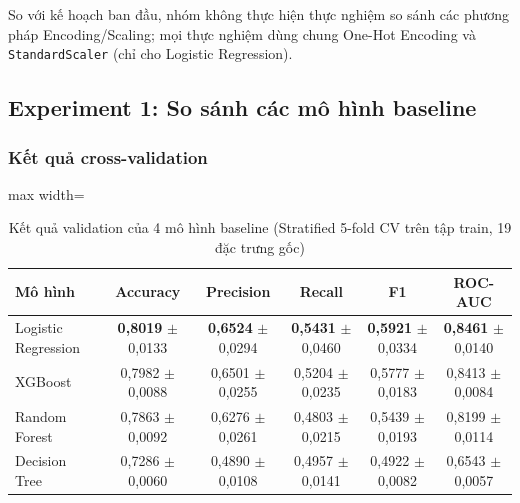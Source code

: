 So với kế hoạch ban đầu, nhóm không thực hiện thực nghiệm so sánh các phương pháp Encoding/Scaling; mọi thực nghiệm dùng chung One-Hot Encoding và \texttt{StandardScaler} (chỉ cho Logistic Regression).

\subsection{Experiment 1: So sánh các mô hình baseline}\label{sec:exp1}

\subsubsection{Kết quả cross-validation}

\begin{table}[H]
\centering
\small
\begin{adjustbox}{max width=\textwidth}
\begin{tabular}{|l|c|c|c|c|c|}
\hline
\textbf{Mô hình} & \textbf{Accuracy} & \textbf{Precision} & \textbf{Recall} & \textbf{F1} & \textbf{ROC-AUC} \\
\hline
Logistic Regression & \textbf{0,8019} $\pm$ 0,0133 & \textbf{0,6524} $\pm$ 0,0294 & \textbf{0,5431} $\pm$ 0,0460 & \textbf{0,5921} $\pm$ 0,0334 & \textbf{0,8461} $\pm$ 0,0140 \\
\hline
XGBoost             & 0,7982 $\pm$ 0,0088 & 0,6501 $\pm$ 0,0255 & 0,5204 $\pm$ 0,0235 & 0,5777 $\pm$ 0,0183 & 0,8413 $\pm$ 0,0084 \\
\hline
Random Forest       & 0,7863 $\pm$ 0,0092 & 0,6276 $\pm$ 0,0261 & 0,4803 $\pm$ 0,0215 & 0,5439 $\pm$ 0,0193 & 0,8199 $\pm$ 0,0114 \\
\hline
Decision Tree       & 0,7286 $\pm$ 0,0060 & 0,4890 $\pm$ 0,0108 & 0,4957 $\pm$ 0,0141 & 0,4922 $\pm$ 0,0082 & 0,6543 $\pm$ 0,0057 \\
\hline
\end{tabular}
\end{adjustbox}
\caption{Kết quả validation của 4 mô hình baseline (Stratified 5-fold CV trên tập train, 19 đặc trưng gốc)}
\label{tab:baseline_cv}
\end{table}

